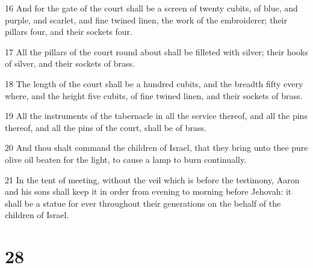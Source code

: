 \par 16 And for the gate of the court shall be a screen of twenty cubits, of blue, and purple, and scarlet, and fine twined linen, the work of the embroiderer; their pillars four, and their sockets four.
\par 17 All the pillars of the court round about shall be filleted with silver; their hooks of silver, and their sockets of brass.
\par 18 The length of the court shall be a hundred cubits, and the breadth fifty every where, and the height five cubits, of fine twined linen, and their sockets of brass.
\par 19 All the instruments of the tabernacle in all the service thereof, and all the pins thereof, and all the pins of the court, shall be of brass.
\par 20 And thou shalt command the children of Israel, that they bring unto thee pure olive oil beaten for the light, to cause a lamp to burn continually.
\par 21 In the tent of meeting, without the veil which is before the testimony, Aaron and his sons shall keep it in order from evening to morning before Jehovah: it shall be a statue for ever throughout their generations on the behalf of the children of Israel.

\chapter{28}

